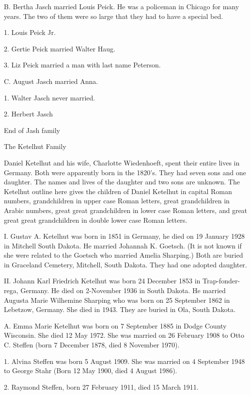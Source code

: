 \documentclass[a4paper]{article}
\begin{document}
B. Bertha Jasch married Louis Peick.  He was a policeman in Chicago for many years. The two of them were so large that they had to have a special bed.  
 
1. Louis Peick Jr.

2. Gertie Peick married Walter Haug.

3. Liz Peick married a man with last name Peterson. 

C. August Jasch married Anna.

1. Walter Jasch never married.   

2. Herbert Jasch



\vskip 4mm
End of Jash family

\pagebreak

{\Huge \noindent The Ketelhut Family}
\vskip 5mm

	Daniel Ketelhut and his wife, Charlotte Wiedenhoeft,  spent their entire lives in Germany. Both were apparently born in the 1820's.  They had seven sons and one daughter.   The names and lives of the daughter and two sons are unknown.  The Ketelhut outline here gives the children of Daniel Ketelhut in capital Roman numbers, grandchildren in upper case Roman letters, great grandchildren in Arabic numbers, great great grandchildren in lower case Roman letters, and great great great grandchildren in double lower case Roman letters.

I. Gustav A. Ketelhut was born in 1851 in Germany, he died on 19 January 1928 in Mitchell South Dakota.  He married Johannah K. Goetsch.  (It is not known if she were related to the Goetsch who married Amelia Sharping.)  Both are buried in Graceland Cemetery, Mitchell, South Dakota.  They had one adopted daughter.

II. Johann Karl Friedrich Ketelhut was born 24 December 1853 in Trap-fonder-rega, Germany.  He died on 2-November 1936 in South Dakota.  He married Augusta Marie Wilhemine Sharping who was born on 25 September 1862 in Lebetzow, Germany.  She died in 1943.  They are buried in Ola, South Dakota.

A. Emma Marie Ketelhut was born on 7 September 1885 in Dodge County Wisconsin.	She died 12 May 1972.  She was married on 26 February 1908 to Otto C. Steffen (born 7 December 1878, died 8 November 1970).
 
1.  Alvina Steffen was born 5 August 1909.  She was married on 4 September 1948 to George Stahr (Born 12 May 1900, died 4 August 1986).
 
2. Raymond Steffen, born 27 February 1911, died 15 March 1911.
\end{document}
